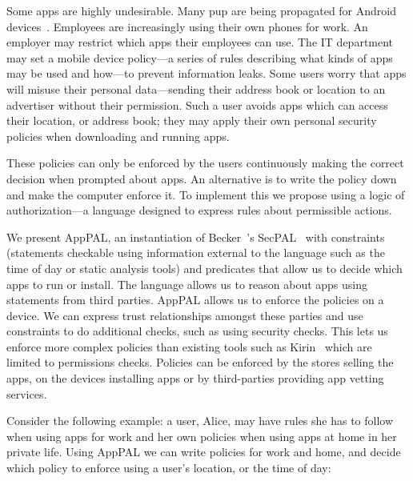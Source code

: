 \documentclass[]{llncs}
\begin{document}
Some apps are highly undesirable.
Many \ac{pup} are being propagated for Android devices~\cite{Truong:2014bi,Svajcer:2013tp}.
Employees are increasingly using their own phones for work.
An employer may restrict which apps their employees can use.
The IT department may set a mobile device policy---a series of rules describing what kinds of apps may be used and how---to prevent information leaks.
Some users worry that apps will misuse their personal data---sending their address book or location to an advertiser without their permission.
Such a user avoids apps which can access their location, or address book; they may apply their own personal security policies when downloading and running apps.

These policies can only be enforced by the users continuously making the correct decision when prompted about apps.
An alternative is to write the policy down and make the computer enforce it.
To implement this we propose using a logic of authorization---a language designed to express rules about permissible actions.

We present AppPAL, an instantiation of Becker~\etal's
SecPAL~\cite{Becker:2006vh} with constraints (statements checkable using information external to the language such as the time of day or static analysis tools) and predicates that allow us to decide which apps to run or install.
The language allows us to reason about apps using statements from third parties.
AppPAL allows us to enforce the policies on a device.
We can express trust relationships amongst these parties and use constraints to do additional checks, such as using security checks.
This lets us enforce more complex policies than existing tools such as Kirin~\cite{Enck:2009ko} which are limited to permissions checks.
Policies can be enforced by the stores selling the apps, on the devices installing apps or by third-parties providing app vetting services.

Consider the following example:
  a user, Alice, may have rules she has to follow when using apps for work and her own policies when using apps at home in her private life.
Using AppPAL we can write policies for work and home, and decide which policy to enforce using a user's location, or the time of day:
\end{document}
